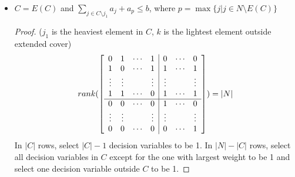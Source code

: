 \begin{itemize}
                    \item $C = E(C)$ and $\sum_{j\in C \setminus j_1} a_j + a_p \le b$, where $p = \max\{j | j\in N \setminus E(C)\}$
                        \begin{proof}
                            ($j_1$ is the heaviest element in $C$, $k$ is the lightest element outside extended cover)
                            \begin{equation*}
                                rank(\left[\begin{array}{c c c c | c c c}
                                    0 & 1 & \cdots & 1 & 0 & \cdots & 0 \\
                                    1 & 0 & \cdots & 1 & 1 & \cdots & 1 \\
                                    \vdots & \vdots & & \vdots & \vdots & & \vdots\\
                                    1 & 1 & \cdots & 0 & 1 & \cdots & 1 \\
                                    \hline
                                    0 & 0 & \cdots & 0 & 1 & \cdots & 0 \\
                                    \vdots & \vdots & & \vdots & \vdots & & \vdots\\
                                    0 & 0 & \cdots & 0 & 0 & \cdots & 1
                                    \end{array}\right]) = |N|
                            \end{equation*}
                            In $|C|$ rows, select $|C| - 1$ decision variables to be 1. In $|N| - |C|$ rows, select all decision variables in $C$ except for the one with largest weight to be 1 and select one decision variable outside $C$ to be 1.
                        \end{proof}


\end{itemize}
